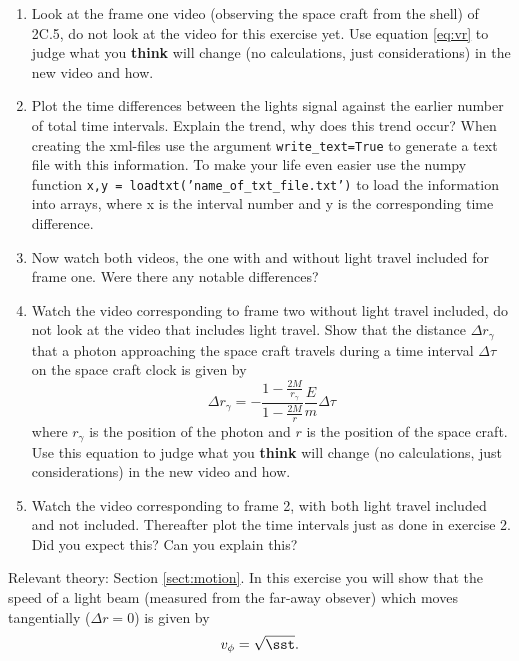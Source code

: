 {\begin{multicols}{2}
\begin{enumerate}
\item Look at the frame one video (observing the space craft from the shell) of 2C.5, do not look at the video for this exercise yet. Use equation \ref{eq:vr} to judge what you {\bf think} will change (no calculations, just considerations) in the new video and how.
\item Plot the time differences between the lights signal against the earlier number of total time intervals. Explain the trend, why does this trend occur? When creating the xml-files use the argument \texttt{write\_text=True} to generate a text file with this information. To make your life even easier use the numpy function \texttt{x,y = loadtxt('name\_of\_txt\_file.txt')} to load the information into arrays, where x is the interval number and y is the corresponding time difference.
\item Now watch both videos, the one with and without light travel included for frame one. Were there any notable differences?
\item  Watch the video corresponding to frame two without light travel included, do not look at the video that includes light travel.  Show that the distance $\Delta r_\gamma$ that a photon approaching the space craft travels during a time interval $\Delta\tau$ on the space craft clock is given by
\[
\Delta r_\gamma=-\frac{1-\frac{2M}{r_\gamma}}{1-\frac{2M}{r}}\frac{E}{m}\Delta\tau
\]
where $r_\gamma$ is the position of the photon and $r$ is the position of the space craft. Use this equation to judge  what you {\bf think} will change (no calculations, just considerations) in the new video and how.
\item Watch the video corresponding to frame 2, with both light travel included and not included. Thereafter plot the time intervals just as done in exercise 2. Did you expect this? Can you explain this?
\end{enumerate}




Relevant theory: Section \ref{sect:motion}.\newline
In this exercise you will show that the speed of a light beam (measured from the far-away obsever) which moves tangentially ($\Delta r=0$) is given by
\[
v_\phi=\sqrt{\sst}.
\]


\end{multicols}}
